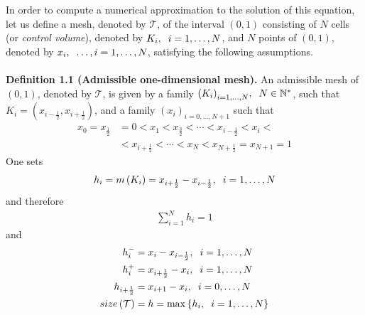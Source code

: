\documentclass[a4paper]{article}
\numberwithin{equation}{section}
\begin{document}
In order to compute a numerical approximation to the solution of this equation, let us define a mesh, denoted by $\mathcal{T}$, of the interval $\left(0,1\right)$ consisting of $N$ cells (or \textit{control volume}), denoted by $K_i,\hspace{0.2cm}i=1,\ldots,N$, and $N$ points of $\left(0,1\right)$, denoted by $x_i,\hspace{0.2cm}\ldots,i=1,\ldots,N$, satisfying the following assumptions.\\
\\
\textbf{Definition 1.1 (Admissible one-dimensional mesh).} An admissible mesh of $\left(0,1\right)$, denoted by $\mathcal{T}$, is given by a family ${\left( {{K_i}} \right)_{i = 1, \ldots ,N}},\hspace{0.2cm}N \in {\mathbb{N}^*}$, such that ${K_i} = \left( {{x_{i - \frac{1}{2}}},{x_{i + \frac{1}{2}}}} \right)$, and a family ${\left( {{x_i}} \right)_{i = 0, \ldots ,N + 1}}$ such that
\begin{align}
{x_0} = {x_{\frac{1}{2}}} &= 0 < {x_1} < {x_{\frac{3}{2}}} <  \cdots  < {x_{i - \frac{1}{2}}} < {x_i} <\\
&< {x_{i + \frac{1}{2}}} <  \cdots  < {x_N} < {x_{N + \frac{1}{2}}} = {x_{N + 1}} = 1
\end{align}
One sets
\begin{align}
h_i = m\left( {{K_i}} \right) = {x_{i + \frac{1}{2}}} - {x_{i - \frac{1}{2}}},\hspace{0.2cm}i = 1, \ldots ,N
\end{align}
and therefore
\begin{align}
\sum\limits_{i = 1}^N {{h_i}}  = 1
\end{align}
and
\begin{align}
h_i^ -  &= {x_i} - {x_{i - \frac{1}{2}}},\hspace{0.2cm}i = 1, \ldots ,N\\
h_i^ +  &= {x_{i + \frac{1}{2}}} - {x_i},\hspace{0.2cm}i = 1, \ldots ,N\\
{h_{i + \frac{1}{2}}} &= {x_{i + 1}} - {x_i},\hspace{0.2cm}i = 0, \ldots ,N\\
size\left( \mathcal{T} \right) &= h = \max \left\{ {{h_i},\hspace{0.2cm}i = 1, \ldots ,N} \right\} \label{1.11}
\end{align}
\end{document}
